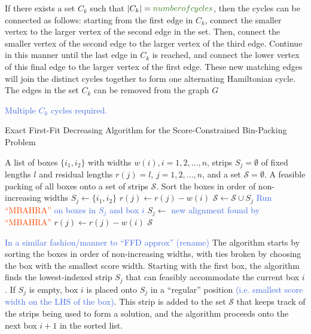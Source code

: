 \documentclass[oribibl]{llncs}
\begin{document}
If there exists a set $C_k$ such that $|C_k| = \textcolor{OliveGreen}{number of cycles}$, then the cycles can be connected as follows: starting from the first edge in $C_k$, connect the smaller vertex to the larger vertex of the second edge in the set. Then, connect the smaller vertex of the second edge to the larger vertex of the third edge. Continue in this manner until the last edge in $C_k$ is reached, and connect the lower vertex of this final edge to the larger vertex of the first edge. These new matching edges will join the distinct cycles together to form one alternating Hamiltonian cycle. The edges in the set $C_k$ can be removed from the graph $G$

\textcolor{RoyalBlue}{Multiple $C_k$ cycles required.}
 













\begin{algorithm}[H]
	\caption{\textcolor{OliveGreen}{Exact First-Fit Decreasing Algorithm for the Score-Constrained Bin-Packing Problem}}
	\label{alg:ffdexact}
	\begin{algorithmic}[1]
	\Require A list of boxes $\{i_1, i_2\}$ with widths $w(i), i = 1, 2, ..., n$, strips $S_j = \emptyset$ of fixed lengths $l$ and residual lengths $r(j) = l$, $j = 1, 2, ...,n$, and a set $\mathcal{S} = \emptyset$.
	\Ensure A feasible packing of all boxes onto a set of strips $\mathcal{S}$.	
	\State Sort the boxes in order of non-increasing widths
				\State $S_j \gets \{i_1, i_2\}$
				\State $r(j) \gets r(j) - w(i)$
				\State $\mathcal{S} \gets \mathcal{S} \cup S_j$
				\Break
				\State \textcolor{RoyalBlue}{Run} \textcolor{OrangeRed}{``MBAHRA''} \textcolor{RoyalBlue}{on boxes in $S_j$ and box $i$}
					\State $S_j \gets$ \textcolor{RoyalBlue}{new alignment found by} \textcolor{OrangeRed}{``MBAHRA''}
					\State $r(j) \gets r(j) - w(i)$
					\Break
				\EndIf
			\EndIf
		\EndFor
	\EndFor
	\Return $\mathcal{S}$
	\end{algorithmic}	
\end{algorithm}

\textcolor{RoyalBlue}{In a similar fashion/manner to ``FFD approx'' (rename)} The algorithm starts by sorting the boxes in order of non-increasing widths, with ties broken by choosing the box with the smallest score width. Starting with the first box, the algorithm finds the lowest-indexed strip $S_j$ that can feasibly accommodate the current box $i$. If $S_j$ is empty, box $i$ is placed onto $S_j$ in a ``regular'' position \textcolor{RoyalBlue}{(i.e. smallest score width on the LHS of the box)}. This strip is added to the set $\mathcal{S}$ that keeps track of the strips being used to form a solution, and the algorithm proceeds onto the next box $i+1$ in the sorted list.
\end{document}

